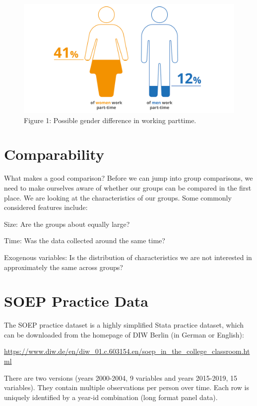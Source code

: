 \documentclass[
]{book}
\begin{document}
\begin{figure}

{\centering \includegraphics[width=0.7\linewidth]{images/parttime} 

}

\caption{\label{fig:intro}Figure 1: Possible gender difference in working parttime.}\label{fig:intro}
\end{figure}

\hypertarget{comparability}{%
\section{Comparability}\label{comparability}}

What makes a good comparison? Before we can jump into group comparisons, we need to make ourselves aware of whether our groups can be compared in the first place. We are looking at the characteristics of our groups. Some commonly considered features include:

Size: Are the groups about equally large?

Time: Was the data collected around the same time?

Exogenous variables: Is the distribution of characteristics we are not interested in approximately the same across groups?

\hypertarget{soep-practice-data}{%
\section{SOEP Practice Data}\label{soep-practice-data}}

The SOEP practice dataset is a highly simplified Stata practice dataset, which can be downloaded from the homepage of DIW Berlin (in German or English):

\url{https://www.diw.de/en/diw_01.c.603154.en/soep_in_the_college_classroom.html}

There are two versions (years 2000-2004, 9 variables and years 2015-2019, 15 variables). They contain multiple observations per person over time. Each row is uniquely identified by a year-id combination (long format panel data).
\end{document}
